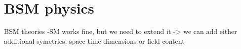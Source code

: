 




\section{BSM physics}

BSM theories
-SM works fine, but we need to extend it -> we can add either additional symetries, space-time dimensions or field content

